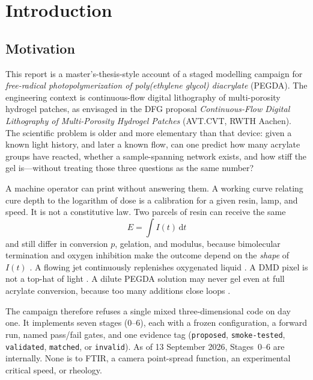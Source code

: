 \chapter{Introduction}
\label{ch:intro}

\section{Motivation}

This report is a master's-thesis-style account of a staged modelling campaign for \emph{free-radical photopolymerization of poly(ethylene glycol) diacrylate} (PEGDA).
The engineering context is continuous-flow digital lithography of multi-porosity hydrogel patches, as envisaged in the DFG proposal \emph{Continuous-Flow Digital Lithography of Multi-Porosity Hydrogel Patches} (AVT.CVT, RWTH Aachen).
The scientific problem is older and more elementary than that device: given a known light history, and later a known flow, can one predict how many acrylate groups have reacted, whether a sample-spanning network exists, and how stiff the gel is---without treating those three questions as the same number?

A machine operator can print without answering them.
A working curve relating cure depth to the logarithm of dose \citep{Jacobs1992book} is a calibration for a given resin, lamp, and speed.
It is not a constitutive law.
Two parcels of resin can receive the same
\begin{equation}
  E = \int I(t)\,\mathrm{d}t
\end{equation}
and still differ in conversion $p$, gelation, and modulus, because bimolecular termination and oxygen inhibition make the outcome depend on the \emph{shape} of $I(t)$ \citep{Wydra2014,Lin2019,Dobson2024}.
A flowing jet continuously replenishes oxygenated liquid \citep{Slutzky2019}.
A DMD pixel is not a top-hat of light \citep{Montgomery2022,Meenakshisundaram2020}.
A dilute PEGDA solution may never gel even at full acrylate conversion, because too many additions close loops \citep{Zhu2020}.

The campaign therefore refuses a single mixed three-dimensional code on day one.
It implements seven stages (0--6), each with a frozen configuration, a forward run, named pass/fail gates, and one evidence tag (\texttt{proposed}, \texttt{smoke-tested}, \texttt{validated}, \texttt{matched}, or \texttt{invalid}).
As of 13 September 2026, Stages~0--6 are \tagvalid{} internally.
None is \tagmatch{} to FTIR, a camera point-spread function, an experimental critical speed, or rheology.

